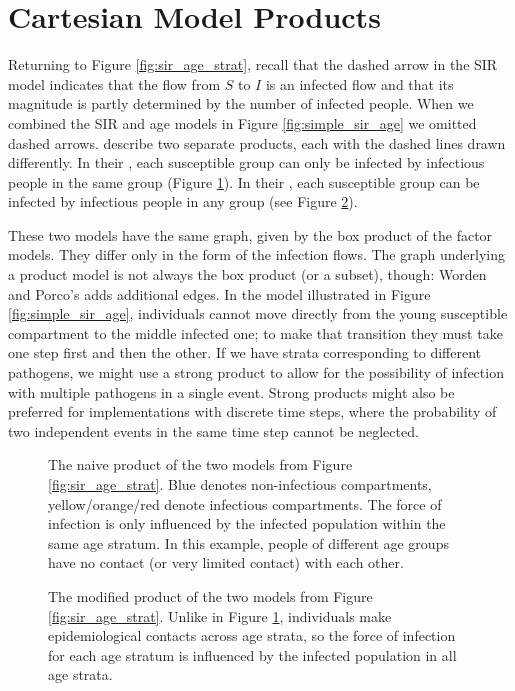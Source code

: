 \section{Cartesian Model Products}\label{worden}

Returning to Figure \ref{fig:sir_age_strat}, recall that the dashed arrow in the SIR model indicates that the flow from $S$ to $I$ is an infected flow and that its magnitude is partly determined by the number of infected people. When we combined the SIR and age models in Figure \ref{fig:simple_sir_age} we omitted dashed arrows. \cite{worden2017products} describe two separate products, each with the dashed lines drawn differently. In their , each susceptible group can only be infected by infectious people in the same group (Figure \ref{fig:naive_product}). In their , each susceptible group can be infected by infectious people in any group (see Figure \ref{fig:modified_product}). 

These two models have the same graph, given by the box product of the factor models. They differ only in the form of the infection flows. The graph underlying a product model is not always the box product (or a subset), though: Worden and Porco's  adds additional edges. In the model illustrated in Figure \ref{fig:simple_sir_age}, individuals cannot move directly from the young susceptible compartment to the middle infected one; to make that transition they must take one step first and then the other. If we have strata corresponding to different pathogens, we might use a strong product to allow for the possibility of infection with multiple pathogens in a single event. Strong products might also be preferred for implementations with discrete time steps, where the probability of two independent events in the same time step cannot be neglected. 

\begin{figure}
    \centering
    
    \caption{The naive product of the two models from Figure \ref{fig:sir_age_strat}. Blue denotes non-infectious compartments, yellow/orange/red denote infectious compartments. The force of infection is only influenced by the infected population within the same age stratum. In this example, people of different age groups have no contact (or very limited contact) with each other.}
    \label{fig:naive_product}
\end{figure}

\begin{figure}
    \centering
    
    \caption{The modified product of the two models from Figure \ref{fig:sir_age_strat}. Unlike in Figure \ref{fig:naive_product}, individuals make epidemiological contacts across age strata, so the force of infection for each age stratum is influenced by the infected population in all age strata.}
    \label{fig:modified_product}
\end{figure}

